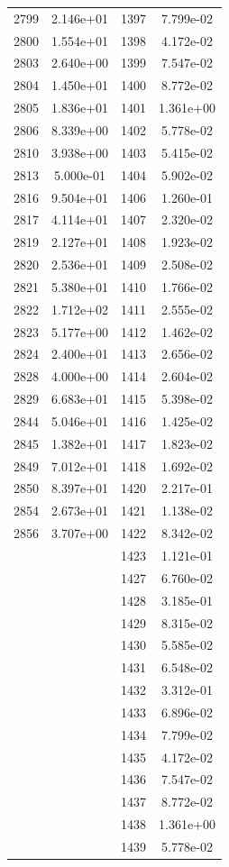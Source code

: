 \documentclass[12pt]{article}
\begin{document}
\begin{longtable}{@{}cccc@{}}
2799 & 2.146e+01 & 1397 & 7.799e-02 \\
2800 & 1.554e+01 & 1398 & 4.172e-02 \\
2803 & 2.640e+00 & 1399 & 7.547e-02 \\
2804 & 1.450e+01 & 1400 & 8.772e-02 \\
2805 & 1.836e+01 & 1401 & 1.361e+00 \\
2806 & 8.339e+00 & 1402 & 5.778e-02 \\
2810 & 3.938e+00 & 1403 & 5.415e-02 \\
2813 & 5.000e-01 & 1404 & 5.902e-02 \\
2816 & 9.504e+01 & 1406 & 1.260e-01 \\
2817 & 4.114e+01 & 1407 & 2.320e-02 \\
2819 & 2.127e+01 & 1408 & 1.923e-02 \\
2820 & 2.536e+01 & 1409 & 2.508e-02 \\
2821 & 5.380e+01 & 1410 & 1.766e-02 \\
2822 & 1.712e+02 & 1411 & 2.555e-02 \\
2823 & 5.177e+00 & 1412 & 1.462e-02 \\
2824 & 2.400e+01 & 1413 & 2.656e-02 \\
2828 & 4.000e+00 & 1414 & 2.604e-02 \\
2829 & 6.683e+01 & 1415 & 5.398e-02 \\
2844 & 5.046e+01 & 1416 & 1.425e-02 \\
2845 & 1.382e+01 & 1417 & 1.823e-02 \\
2849 & 7.012e+01 & 1418 & 1.692e-02 \\
2850 & 8.397e+01 & 1420 & 2.217e-01 \\
2854 & 2.673e+01 & 1421 & 1.138e-02 \\
2856 & 3.707e+00 & 1422 & 8.342e-02 \\
 &  & 1423 & 1.121e-01 \\
 &  & 1427 & 6.760e-02 \\
 &  & 1428 & 3.185e-01 \\
 &  & 1429 & 8.315e-02 \\
 &  & 1430 & 5.585e-02 \\
 &  & 1431 & 6.548e-02 \\
 &  & 1432 & 3.312e-01 \\
 &  & 1433 & 6.896e-02 \\
 &  & 1434 & 7.799e-02 \\
 &  & 1435 & 4.172e-02 \\
 &  & 1436 & 7.547e-02 \\
 &  & 1437 & 8.772e-02 \\
 &  & 1438 & 1.361e+00 \\
 &  & 1439 & 5.778e-02 \\

\bottomrule
\end{longtable}
\end{document}
